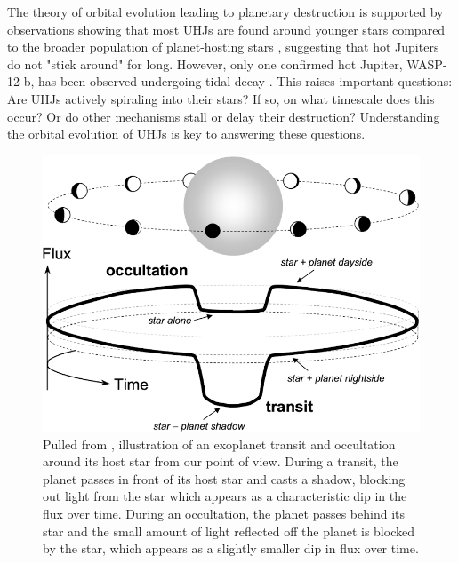 \documentclass[oneside,12pt]{amsart}
\numberwithin{page}{section}
\begin{document}
The theory of orbital evolution leading to planetary destruction is supported by observations showing that most UHJs are found around younger stars compared to the broader population of planet-hosting stars \citep{hamer2019hot}, suggesting that hot Jupiters do not "stick around" for long. However, only one confirmed hot Jupiter, WASP-12 b, has been observed undergoing tidal decay \citep{yee2019orbit}. This raises important questions: Are UHJs actively spiraling into their stars? If so, on what timescale does this occur? Or do other mechanisms stall or delay their destruction? Understanding the orbital evolution of UHJs is key to answering these questions.

\begin{figure}[htbp]
    \centering
    \includegraphics[width=0.6\linewidth]{figs/winn_fig1.png}
    \caption{Pulled from \citet{winn2010transits}, illustration of an exoplanet transit and occultation around its host star from our point of view. During a transit, the planet passes in front of its host star and casts a shadow, blocking out light from the star which appears as a characteristic dip in the flux over time. During an occultation, the planet passes behind its star and the small amount of light reflected off the planet is blocked by the star, which appears as a slightly smaller dip in flux over time.}
    \label{fig:winnfig1}
\end{figure}
\end{document}

